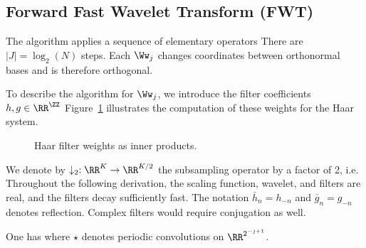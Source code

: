    
\subsection{Forward Fast Wavelet Transform (FWT)}

The algorithm applies a sequence of elementary operators
There are $|J|=\log_2(N)$ steps. Each $\Ww_j$ changes coordinates between orthonormal bases and is therefore orthogonal.

To describe the algorithm for $\Ww_j$, we introduce the filter coefficients $h,g \in \RR^\ZZ$
Figure~\ref{fig-haar-inner} illustrates the computation of these weights for the Haar system.

\begin{figure}[tbp]
\centering
{}
\caption{Haar filter weights as inner products.}
\label{fig-haar-inner}
\end{figure}


We denote by $\downarrow_2 : \RR^K \rightarrow \RR^{K/2}$ the subsampling operator by a factor of 2, i.e.
Throughout the following derivation, the scaling function, wavelet, and filters are real, and the filters decay sufficiently fast. The notation $\bar h_n=h_{-n}$ and $\bar g_n=g_{-n}$ denotes reflection. Complex filters would require conjugation as well.

\begin{prop}
One has
where $\star$ denotes periodic convolutions on $\RR^{2^{-j+1}}$.
\end{prop}

